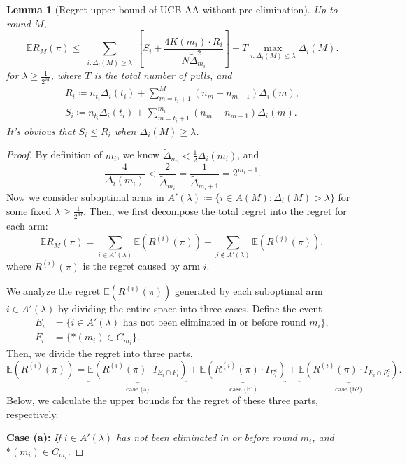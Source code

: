 \documentclass[11pt]{article}
\newtheorem{lemma}{Lemma}
\begin{document}
\begin{lemma}[Regret upper bound of UCB-AA without pre-elimination]
\label{UCB-A2 upper bound}
Up to round $M$, 
\[\mathbb{E}R_M(\pi)\leq \sum_{\substack{i: \Delta_i(M) \geq \lambda}} \left[ S_i +\frac{4K(m_i)\cdot R_i}{N\tilde{\Delta}_{m_i}^2}\right] + T\max_{i:\Delta_i(M)\leq \lambda}  \Delta_i(M).\]
for $\lambda\geq \frac{1}{2^M}$, where $T$ is the total number of pulls, and 
\begin{align*}
    R_i\coloneqq n_{t_i}\Delta_i(t_i)+\sum_{m=t_i+1}^M(n_m-n_{m-1})\Delta_i(m),\\
    S_i\coloneqq n_{t_i}\Delta_i(t_i)+\sum_{m=t_i+1}^{m_i}(n_m-n_{m-1})\Delta_i(m).
\end{align*}
It's obvious that $S_i\leq R_i$ when $\Delta_i(M) \geq \lambda$.
\end{lemma}
\begin{proof}
    By definition of $m_i$, we know $\tilde{\Delta}_{m_i}<\frac{1}{2}\Delta_i(m_i)$, and
    \[\frac{4}{\Delta_i(m_i)}<\frac{2}{\tilde{\Delta}_{m_i}}=\frac{1}{\tilde{\Delta}_{m_i+1}}=2^{m_i+1}.\]
Now we consider suboptimal arms in $A'(\lambda)\coloneqq\{i\in A(M):\Delta_i(M)>\lambda\}$ for some fixed $\lambda\geq \frac{1}{2^M}$. Then, we first decompose the total regret into the regret for each arm:
\[\mathbb{E}R_M(\pi)=\sum_{i\in A'(\lambda)}\mathbb{E}(R^{(i)}(\pi)) + \sum_{j\notin A'(\lambda)}\mathbb{E}(R^{(j)}(\pi)) ,\]
where $R^{(i)}(\pi)$ is the regret caused by arm $i$.

We analyze the regret $\mathbb{E}(R^{(i)}(\pi)) $ generated by each suboptimal arm $i\in A'(\lambda)$ by dividing the entire space into three cases. Define the event 
\begin{align*}
    E_i&=\{ i\in A'(\lambda) \text{ has not been eliminated in or before round } m_i  \}, \\
    F_i&=\{ *(m_i) \in C_{m_i} \}.
\end{align*}
Then, we divide the regret into three parts, 
\[\mathbb{E}(R^{(i)}(\pi)) = \underbrace{\mathbb{E}\left(R^{(i)}(\pi)\cdot I_{E_i\cap F_i}\right)}_{\text{case (a)}} + \underbrace{\mathbb{E}\left(R^{(i)}(\pi)\cdot I_{E_i^c}\right)}_{\text{case (b1)}} + \underbrace{\mathbb{E}\left(R^{(i)}(\pi)\cdot I_{E_i\cap F_i^c}\right)}_{\text{case (b2)}}.\]
Below, we calculate the upper bounds for the regret of these three parts, respectively.

\textbf{Case (a):} \textit{If \( i\in A'(\lambda) \) has not been eliminated in or before round \( m_i \), and \( *(m_i) \in C_{m_i} \).  }


\end{proof}
\end{document}
